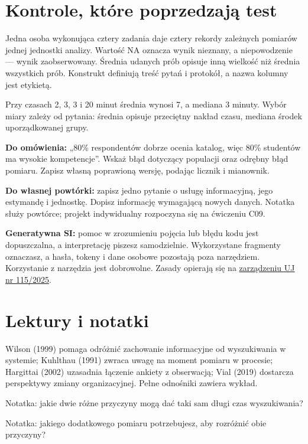 \documentclass[
  polish,
  11pt,
  a4paper,
]{article}
\begin{document}
\section{Kontrole, które poprzedzają
test}\label{kontrole-ktuxf3re-poprzedzajux105-test}

Jedna osoba wykonująca cztery zadania daje cztery rekordy zależnych
pomiarów jednej jednostki analizy. Wartość NA oznacza wynik nieznany, a
niepowodzenie --- wynik zaobserwowany. Średnia udanych prób opisuje inną
wielkość niż średnia wszystkich prób. Konstrukt definiują treść pytań i
protokół, a nazwa kolumny jest etykietą.

Przy czasach 2, 3, 3 i 20 minut średnia wynosi 7, a mediana 3 minuty.
Wybór miary zależy od pytania: średnia opisuje przeciętny nakład czasu,
mediana środek uporządkowanej grupy.

\textbf{Do omówienia:} „80\% respondentów dobrze ocenia katalog, więc
80\% studentów ma wysokie kompetencje''. Wskaż błąd dotyczący populacji
oraz odrębny błąd pomiaru. Zapisz własną poprawioną wersję, podając
licznik i mianownik.

\textbf{Do własnej powtórki:} zapisz jedno pytanie o usługę
informacyjną, jego estymandę i jednostkę. Dopisz informację wymagającą
nowych danych. Notatka służy powtórce; projekt indywidualny rozpoczyna
się na ćwiczeniu C09.

\textbf{Generatywna SI:} pomoc w zrozumieniu pojęcia lub błędu kodu jest
dopuszczalna, a interpretację piszesz samodzielnie. Wykorzystane
fragmenty oznaczasz, a hasła, tokeny i dane osobowe pozostają poza
narzędziem. Korzystanie z narzędzia jest dobrowolne. Zasady opierają się
na
\href{https://bip.uj.edu.pl/documents/1384597/159749054/zarz_115_2025.pdf}{zarządzeniu
UJ nr 115/2025}.

\section{Lektury i notatki}\label{lektury-i-notatki}

Wilson (1999) pomaga odróżnić zachowanie informacyjne od wyszukiwania w
systemie; Kuhlthau (1991) zwraca uwagę na moment pomiaru w procesie;
Hargittai (2002) uzasadnia łączenie ankiety z obserwacją; Vial (2019)
dostarcza perspektywy zmiany organizacyjnej. Pełne odnośniki zawiera
wykład.

Notatka: jakie dwie różne przyczyny mogą dać taki sam długi czas
wyszukiwania?

Notatka: jakiego dodatkowego pomiaru potrzebujesz, aby rozróżnić obie
przyczyny?
\end{document}
